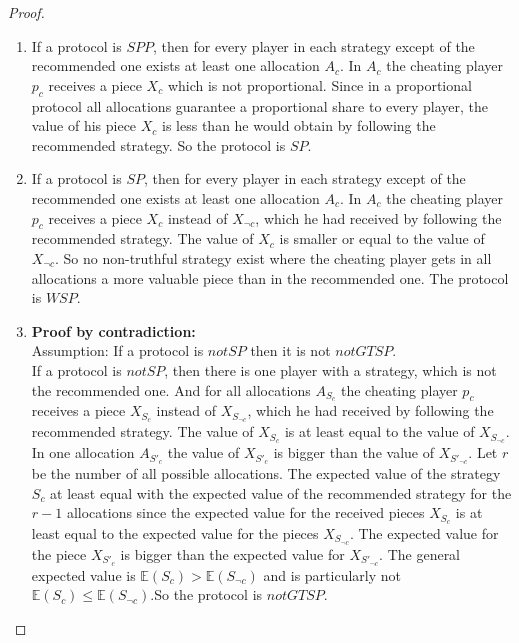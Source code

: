 \begin{proof}
\textcolor{white}{x}
\begin{enumerate}
\item If a protocol is $SPP$, then for every player in each strategy except of the recommended one exists at least one allocation $A_c$. In $A_c$ the cheating player $p_c$ receives a piece $X_c$ which is not proportional. Since in a proportional protocol all allocations guarantee a proportional share to every player, the value of his piece $X_c$ is less than he would obtain by following the recommended strategy. So the protocol is $SP$.   
\item If a protocol is $SP$, then for every player in each strategy except of the recommended one exists at least one allocation $A_c$. In $A_c$ the cheating player $p_c$ receives a piece $X_{c}$ instead of $X_{\neg c}$, which he had received by following the recommended strategy. The value of $X_c$ is smaller or equal to the value of $X_{\neg c}$. So no non-truthful strategy exist where the cheating player gets in all allocations a more valuable piece than in the recommended one. The protocol is $WSP$.
\pagebreak
\item \textbf{Proof by contradiction:}\\
\newline
Assumption: If a protocol is $notSP$ then it is not $notGTSP$.\\
If a protocol is $notSP$, then there is one player with a strategy, which is not the recommended one. And for all allocations $A_{S_c}$ the cheating player $p_c$ receives a piece $X_{S_c}$ instead of $X_{S_{\neg c}}$, which he had received by following the recommended strategy. The value of $X_{S_c}$ is at least equal to the value of $X_{S_{\neg c}}$. In one allocation $A_{S'_c}$ the value of $X_{S'_c}$ is bigger than the value of $X_{S'_{\neg c}}$. Let $r$ be the number of all possible allocations. The expected value of the strategy ${S_c}$ at least equal with the expected value of the recommended strategy for the $r-1$ allocations since the expected value for the received pieces $X_{S_c}$ is at least equal to the expected value for the pieces $X_{S_{\neg c}}$. The expected value for the piece $X_{S'_c}$ is bigger than the expected value for $X_{S'_{\neg c}}$. The general expected value is $\mathbb{E}(S_c)>\mathbb{E}(S_{\neg c})$ and is particularly not $\mathbb{E}(S_c)\leq \mathbb{E}(S_{\neg c})$.\blitza So the protocol is $notGTSP$.  

\end{enumerate}
\end{proof}
